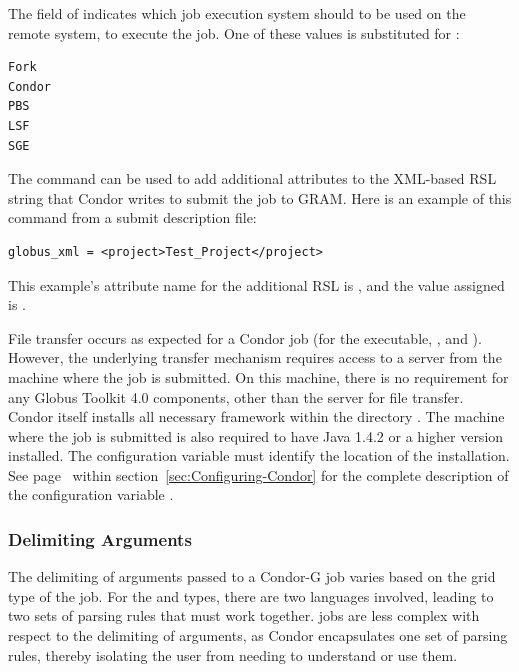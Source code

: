 The  field of 
indicates which job execution
system should to be used on the remote system, to execute the job. One of
these values is substituted for :
\begin{verbatim}
Fork
Condor
PBS
LSF
SGE
\end{verbatim}


The  command can be used to add additional
attributes to the XML-based RSL string that Condor writes to submit the
job to GRAM.
Here is an example of this command from a submit description file:
\begin{verbatim}
globus_xml = <project>Test_Project</project>
\end{verbatim}
This example's attribute name for the additional RSL is
, and the value assigned is .

File transfer occurs as expected for a Condor job 
(for the executable, , and ).
However, the underlying transfer mechanism requires access
to a  server from the machine where the job
is submitted.
On this machine,
there is no requirement for any Globus Toolkit 4.0 components, other than
the  server for file transfer.
Condor itself installs all necessary framework within the directory 
.
The machine where the job is submitted
is also required to
have Java 1.4.2 or a higher version installed.
The configuration variable 
must identify the location of the installation.
See page~\pageref{param:Java} within
section~\ref{sec:Configuring-Condor}
for the complete description of the configuration variable .


\subsubsection{\label{sec:CondorG-Submit-Args}Delimiting Arguments}

The delimiting of arguments passed to a Condor-G 
job varies based on the grid type of the job.
For the  and  types,
there are two languages involved, 
leading to two sets of parsing rules that must work together.
 jobs
are less complex with respect to the delimiting of arguments,
as Condor encapsulates one set of parsing rules,
thereby isolating the user from needing to understand or use them.

